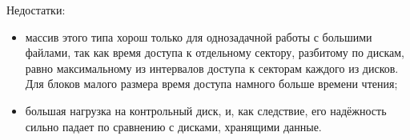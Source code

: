 \begin {itemize}
Недостатки:
\begin {itemize}
\item массив этого типа хорош только для однозадачной работы с большими файлами, так как время доступа к отдельному сектору, разбитому по дискам, равно максимальному из интервалов доступа к секторам каждого из дисков. Для блоков малого размера время доступа намного больше времени чтения;
\item большая нагрузка на контрольный диск, и, как следствие, его надёжность сильно падает по сравнению с дисками, хранящими данные.
\end {itemize}

\begin{figure}[h!]
\begin{minipage}[h]{0.3\linewidth}
\end{minipage}
\hfill
\begin{minipage}[h]{0.3\linewidth}

\end{minipage}
\end{figure}
\end{itemize}

